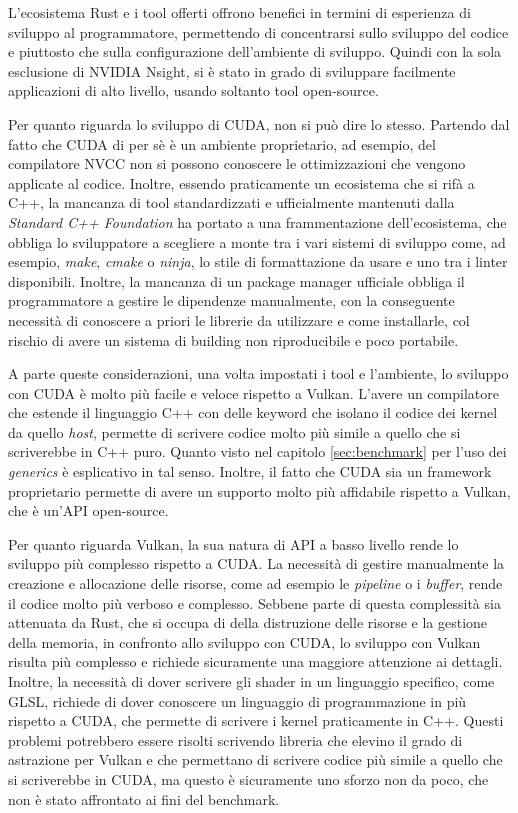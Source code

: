 L'ecosistema Rust e i tool offerti offrono benefici in termini di esperienza di sviluppo al programmatore, permettendo di concentrarsi sullo sviluppo del codice e piuttosto che sulla configurazione dell'ambiente di sviluppo. Quindi con la sola esclusione di NVIDIA Nsight, si è stato in grado di sviluppare facilmente applicazioni di alto livello, usando soltanto tool open-source.

\newpage

Per quanto riguarda lo sviluppo di \gls{CUDA}, non si può dire lo stesso. Partendo dal fatto che \gls{CUDA} di per sè è un ambiente proprietario, ad esempio, del compilatore \gls{NVCC} non si possono conoscere le ottimizzazioni che vengono applicate al codice. Inoltre, essendo praticamente un ecosistema che si rifà a C++, la mancanza di tool standardizzati e ufficialmente mantenuti dalla \textit{Standard C++ Foundation} ha portato a una frammentazione dell'ecosistema, che obbliga lo sviluppatore a scegliere a monte tra i vari sistemi di sviluppo come, ad esempio, \textit{make}, \textit{cmake} o \textit{ninja}, lo stile di formattazione da usare e uno tra i linter disponibili. Inoltre, la mancanza di un package manager ufficiale obbliga il programmatore a gestire le dipendenze manualmente, con la conseguente necessità di conoscere a priori le librerie da utilizzare e come installarle, col rischio di avere un sistema di building non riproducibile e poco portabile.

A parte queste considerazioni, una volta impostati i tool e l'ambiente, lo sviluppo con \gls{CUDA} è molto più facile e veloce rispetto a Vulkan. L'avere un
compilatore che estende il linguaggio C++ con delle keyword che isolano il
codice dei kernel da quello \textit{host}, permette di scrivere codice molto più simile a quello che si scriverebbe in C++ puro. Quanto visto nel capitolo \ref{sec:benchmark} per l'uso dei \textit{generics} è esplicativo in tal senso. Inoltre, il fatto che \gls{CUDA} sia un framework proprietario permette di avere un supporto molto più affidabile rispetto a Vulkan, che è un'\gls{API} open-source.


Per quanto riguarda Vulkan, la sua natura di \gls{API} a basso livello rende lo sviluppo più complesso rispetto a \gls{CUDA}. La necessità di gestire manualmente la creazione e allocazione delle risorse, come ad esempio le \textit{pipeline} o i \textit{buffer}, rende il codice molto più verboso e complesso. Sebbene parte di questa complessità sia attenuata da Rust, che si occupa di della distruzione delle risorse e la gestione della memoria, in confronto allo sviluppo con \gls{CUDA}, lo sviluppo con Vulkan risulta più complesso e richiede sicuramente una maggiore attenzione ai dettagli. Inoltre, la necessità di dover scrivere gli shader in un linguaggio specifico, come \gls{GLSL}, richiede di dover conoscere un linguaggio di programmazione in più rispetto a \gls{CUDA}, che permette di scrivere i kernel praticamente in C++.
Questi problemi potrebbero essere risolti scrivendo libreria che elevino il grado di astrazione per Vulkan e che permettano di scrivere codice più simile a quello che si scriverebbe in \gls{CUDA}, ma questo è sicuramente uno sforzo non da poco, che non è stato affrontato ai fini del benchmark.


